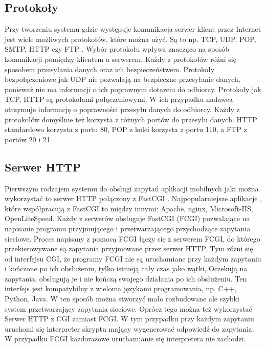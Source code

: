 \documentclass[eng]{mgr}
\begin{document}
			\subsection{Protokoły}
			Przy tworzeniu systemu gdzie występuje komunikacja serwer-klient przez Internet jest wiele możliwych protokołów, które można użyć. Są to np. TCP, UDP, POP, SMTP, HTTP czy FTP \cite{protocols}. Wybór protokołu wpływa znacząco na sposób komunikacji pomiędzy klientem a serwerem. Każdy z protokołów różni się sposobem przesyłania danych oraz ich bezpieczeństwem. Protokoły bezpołączeniowe jak UDP nie pozwalają na bezpieczne przesyłanie danych, ponieważ nie ma informacji o ich poprawnym dotarciu do odbiorcy. Protokoły jak TCP, HTTP są protokołami połączeniowymi. W ich przypadku nadawca otrzymuje informację o poprawności przesyłu danych do odbiorcy. Każdy z protokołów domyślnie też korzysta z różnych portów do przesyłu danych. HTTP standardowo korzysta z portu 80, POP z kolei korzysta z portu 110, a FTP z portów 20 i 21.
	
			\subsection{Serwer HTTP}
			Pierwszym rodzajem systemu do obsługi zapytań aplikacji mobilnych jaki można wykorzystać to serwer HTTP połączony z FastCGI \cite{fcgi}. Najpopularniejsze aplikacje \cite{httpserversusage}, które współpracują z FastCGI to między innymi: Apache, nginx, Microsoft-IIS, OpenLiteSpeed. Każdy z serwerów obsługuje FastCGI (FCGI) pozwalające na napisanie programu przyjmującego i przetwarzającego przychodzące zapytania sieciowe. Proces napisany z pomocą FCGI łączy się z serwerem FCGI, do którego przekierowywane są zapytania przyjmowane przez serwer HTTP. Tym różni się od interfejsu CGI, że programy FCGI nie są uruchamiane przy każdym zapytaniu i kończone po ich obsłużeniu, tylko istnieją cały czas jako wątki, Oczekują na zapytania, obsługują je i nie kończą swojego działania po ich obsłużeniu. Ten interfejs jest kompatybilny z wieloma językami programowania, np. C++, Python, Java. W ten sposób można stworzyć mało rozbudowane ale szybki system przetwarzający zapytania sieciowe.
			Oprócz tego można też wykorzystać Serwer HTTP z CGI zamiast FCGI. W tym przypadku przy każdym zapytaniu uruchomi się interpreter skryptu mający wygenerować odpowiedź do zapytania. W przypadku FCGI każdorazowe uruchamianie się interpretera nie zachodzi.
			
\end{document}
